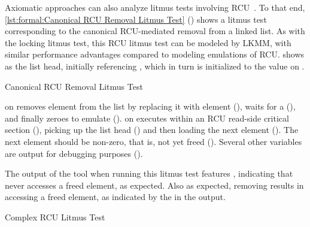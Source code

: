 \begin{fcvref}
Axiomatic approaches can also analyze litmus tests involving
RCU~\cite{Alglave:2018:FSC:3173162.3177156}.
To that end,
\cref{lst:formal:Canonical RCU Removal Litmus Test}
()
shows a litmus test corresponding to the canonical RCU-mediated
removal from a linked list.
As with the locking litmus test, this RCU litmus test can be
modeled by LKMM, with similar performance advantages compared
to modeling emulations of RCU\@.
 shows  as the list head, initially
referencing , which in turn is initialized to the value
 on .

\begin{listing}

\caption{Canonical RCU Removal Litmus Test}
\label{lst:formal:Canonical RCU Removal Litmus Test}
\end{listing}

 on 
removes element  from the list by replacing it with element 
(),
waits for a  (),
and finally zeroes  to emulate  ().
 on 
executes within an RCU read-side critical section
(),
picking up the list head () and then
loading the next element ().
The next element should be non-zero, that is, not yet freed
().
Several other variables are output for debugging purposes
().

The output of the  tool when running this litmus test features
, indicating that  never accesses a freed element,
as expected.
Also as expected, removing  results in 
accessing a freed element, as indicated by the  in
the  output.
\end{fcvref}

\begin{listing}
\caption{Complex RCU Litmus Test}
\label{lst:formal:Complex RCU Litmus Test}
\end{listing}

